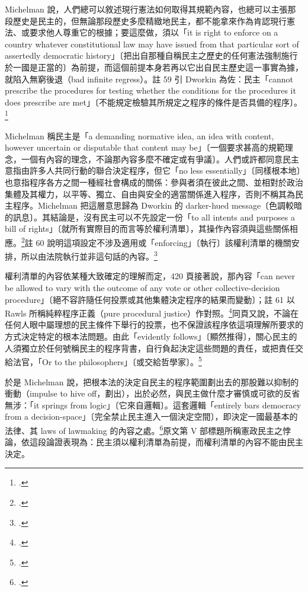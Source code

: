 Michelman 說，人們總可以敘述現行憲法如何取得其規範內容，也總可以主張那段歷史是民主的，但無論那段歷史多麼精緻地民主，都不能拿來作為肯認現行憲法、或要求他人尊重它的根據；要這麼做，須以「it is right to enforce on a country whatever constitutional law may have issued from that particular sort of assertedly democratic history」〔把出自那種自稱民主之歷史的任何憲法強制施行於一國是正當的〕為前提，而這個前提本身若再以它出自民主歷史這一事實為據，就陷入無窮後退（bad infinite regress）。註 59 引 Dworkin 為佐：民主「cannot prescribe the procedures for testing whether the conditions for the procedures it does prescribe are met」〔不能規定檢驗其所規定之程序的條件是否具備的程序〕。\footcite[419 \& n.59（轉引 Dworkin, Freedom's Law 33 (1996)）]{michelman1998}

Michelman 稱民主是「a demanding normative idea, an idea with content, however uncertain or disputable that content may be」〔一個要求甚高的規範理念，一個有內容的理念，不論那內容多麼不確定或有爭議〕。人們或許都同意民主意指由許多人共同行動的聯合決定程序，但它「no less essentially」〔同樣根本地〕也意指程序各方之間一種經社會構成的關係：參與者須在彼此之間、並相對於政治集體及其權力，以平等、獨立、自由與安全的適當關係進入程序，否則不稱其為民主程序。Michelman 把這層意思歸為 Dworkin 的 darker-hued message〔色調較暗的訊息〕。其結論是，沒有民主可以不先設定一份「to all intents and purposes a bill of rights」〔就所有實際目的而言等於權利清單〕，其操作內容須與這些關係相應。\footcite[419]{michelman1998}註 60 說明這項設定不涉及適用或「enforcing」〔執行〕該權利清單的機關安排，所以由法院執行並非這句話的內容。\footcite[419 n.60]{michelman1998}

權利清單的內容依某種大致確定的理解而定，420 頁接著說，那內容「can never be allowed to vary with the outcome of any vote or other collective-decision procedure」〔絕不容許隨任何投票或其他集體決定程序的結果而變動〕；註 61 以 Rawls 所稱純粹程序正義（pure procedural justice）作對照。\footcite[420 \& n.61]{michelman1998}同頁又說，不論在任何人眼中屬理想的民主條件下舉行的投票，也不保證該程序依這項理解所要求的方式決定特定的根本法問題。由此「evidently follows」〔顯然推得〕，關心民主的人須獨立於任何號稱民主的程序背書，自行負起決定這些問題的責任，或把責任交給法官，「Or to the philosophers」〔或交給哲學家〕。\footcite[420]{michelman1998}

於是 Michelman 說，把根本法的決定自民主的程序範圍劃出去的那股難以抑制的衝動（impulse to hive off，劃出），出於必然，與民主做什麼才審慎或可欲的反省無涉：「it springs from logic」〔它來自邏輯〕。這套邏輯「entirely bars democracy from a decision-space」〔完全禁止民主進入一個決定空間〕，即決定一國最基本的法律、其 laws of lawmaking 的內容之處。\footcite[420]{michelman1998}原文第 V 部標題所稱憲政民主之悖論，依這段論證表現為：民主須以權利清單為前提，而權利清單的內容不能由民主決定。

